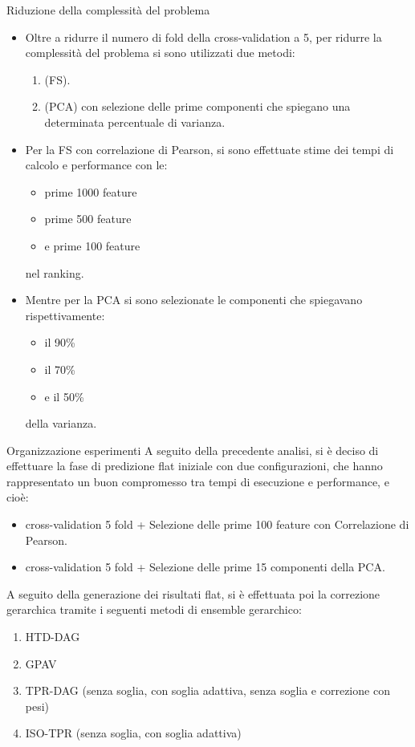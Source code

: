 \documentclass[9pt]{beamer}
\begin{document}
\begin{tframe}{Riduzione della complessità del problema}
\begin{itemize}
\item Oltre a ridurre il numero di fold della cross-validation a 5, per ridurre la complessità del problema si sono utilizzati due metodi:
\begin{enumerate}
\item {} (FS).
\item {} (PCA) con selezione delle prime componenti che spiegano una determinata percentuale di varianza.
\end{enumerate}
\item Per la FS con correlazione di Pearson, si sono effettuate stime dei tempi di calcolo e performance con le:
\begin{itemize}
\item prime 1000 feature
\item prime 500 feature
\item e prime 100 feature
\end{itemize}
nel ranking.
\item Mentre per la PCA si sono selezionate le componenti che spiegavano rispettivamente:
\begin{itemize}
\item il 90\%
\item il 70\%
\item e il 50\%
\end{itemize}
della varianza.
\end{itemize}
\end{tframe}

\begin{tframe}{Organizzazione esperimenti}
A seguito della precedente analisi, si è deciso di effettuare la fase di predizione flat iniziale con due configurazioni, che hanno rappresentato un buon compromesso tra tempi di esecuzione e performance, e cioè:
\begin{itemize}
\item cross-validation 5 fold + Selezione delle prime 100 feature con Correlazione di Pearson.
\item cross-validation 5 fold + Selezione delle prime 15 componenti della PCA.
\end{itemize} 
A seguito della generazione dei risultati flat, si è effettuata poi la correzione gerarchica tramite i seguenti metodi di ensemble gerarchico:

\begin{enumerate}
\item HTD-DAG 
\item GPAV 
\item TPR-DAG  (senza soglia, con soglia adattiva, senza soglia e correzione con pesi)
\item ISO-TPR  (senza soglia, con soglia adattiva)
\end{enumerate}
\end{tframe}
\end{document}
